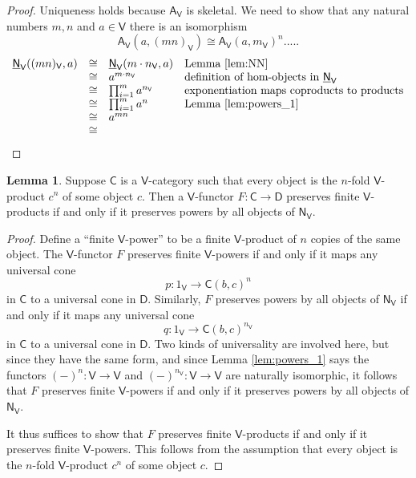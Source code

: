 \documentclass{amsart}
\theoremstyle{definition}
\newtheorem{lemma}[theorem]{Lemma}
\newcommand{\NN}{\mathsf{N}}
\newcommand{\A}{\mathsf{A}}
\newcommand{\V}{\mathsf{V}}
\newcommand{\D}{\mathsf{D}}
\newcommand{\C}{\mathsf{C}}
\newcommand{\maps}{\colon}
\begin{document}
\begin{proof}
Uniqueness holds because $\A_\V$ is skeletal.  We need to show 
that any natural numbers $m,n$ and $a \in \V$ there is an isomorphism
\[     \A_\V(a, (mn)_\V) \cong \A_\V(a,m_\V)^n  .....\]
\[\begin{array}{rcll}
	\underline{\NN}_\V((mn)_\V, a) & \cong & \underline{\NN}_\V(m \cdot n_\V,a) & \text{Lemma \ref{lem:NN}} \\
	&\cong &  a^{m \cdot n_\V} & \text{definition of hom-objects in $\underline{\NN}_\V$} \\
	&\cong & \prod_{i=1}^m a^{n_\V} & \text{exponentiation maps coproducts to products} \\
	&\cong & \prod_{i=1}^m a^n  & \text{Lemma \ref{lem:powers_1}} \\
	&\cong& a^{mn} \\
	&\cong& 
\end{array}
\]
\end{proof}	
\fi


\begin{lemma}
\label{lem:powers_3}
Suppose $\C$ is a $\V$-category such that every object is the $n$-fold $\V$-product $c^n$ of some object $c$.   Then a $\V$-functor $F \maps \C \to \D$ preserves finite $\V$-products if and only if it preserves powers by all objects of $\NN_\V$.
\end{lemma}

\begin{proof}
Define a ``finite $\V$-power'' to be a finite $\V$-product of $n$ copies of the same object.
The $\V$-functor $F$ preserves finite $\V$-powers if and only if it maps any universal cone
\[        p \maps 1_\V \to \C(b,c)^n  \]
in $\C$ to a universal cone in $\D$.   Similarly, $F$ preserves powers by all objects of $\NN_\V$ if and only if it maps any universal cone
\[       q \maps 1_\V \to \C(b,c)^{n_\V}  \]
in $\C$ to a universal cone in $\D$.   Two kinds of universality are involved here, but
since they have the same form, and since Lemma \ref{lem:powers_1} says the functors $(-)^n \maps \V\to \V$ and $(-)^{n_\V} \maps \V\to \V$ are naturally isomorphic,
it follows that $F$ preserves finite $\V$-powers if and only if it preserves powers by all objects of $\NN_\V$.

It thus suffices to show that $F$ preserves finite $\V$-products if and only if it preserves
finite $\V$-powers.  This follows from the assumption that every object is the $n$-fold $\V$-product $c^n$ of some object $c$. 
\end{proof}
\end{document}
